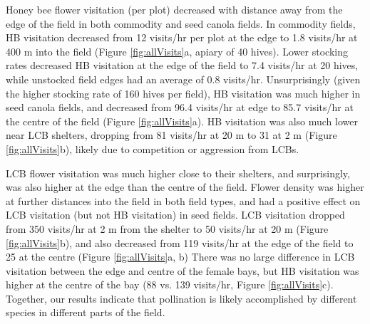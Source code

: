 \documentclass[12pt]{article} %
\begin{document}
Honey bee flower visitation (per plot) decreased with distance away from the edge of the field in both commodity and seed canola fields.
In commodity fields, HB visitation decreased from 12 visits/hr per plot at the edge to 1.8 visits/hr at 400 m into the field (Figure \ref{fig:allVisits}a, apiary of 40 hives).
Lower stocking rates decreased HB visitation at the edge of the field to 7.4 visits/hr at 20 hives, while unstocked field edges had an average of 0.8 visits/hr.
Unsurprisingly (given the higher stocking rate of 160 hives per field), HB visitation was much higher in seed canola fields, and decreased from 96.4 visits/hr at edge to 85.7 visits/hr at the centre of the field (Figure \ref{fig:allVisits}a). 
HB visitation was also much lower near LCB shelters, dropping from 81 visits/hr at 20 m to 31 at 2 m (Figure \ref{fig:allVisits}b), likely due to competition or aggression from LCBs.


LCB flower visitation was much higher close to their shelters, and surprisingly, was also higher at the edge than the centre of the field.
Flower density was higher at further distances into the field in both field types, and had a positive effect on LCB visitation (but not HB visitation) in seed fields.
LCB visitation dropped from 350 visits/hr at 2 m from the shelter to 50 visits/hr at 20 m (Figure \ref{fig:allVisits}b), and also decreased from 119 visits/hr at the edge of the field to 25 at the centre (Figure \ref{fig:allVisits}a, b)
There was no large difference in LCB visitation between the edge and centre of the female bays, but HB visitation was higher at the centre of the bay (88 vs. 139 visits/hr, Figure \ref{fig:allVisits}c).
Together, our results indicate that pollination is likely accomplished by different species in different parts of the field.
\end{document}
